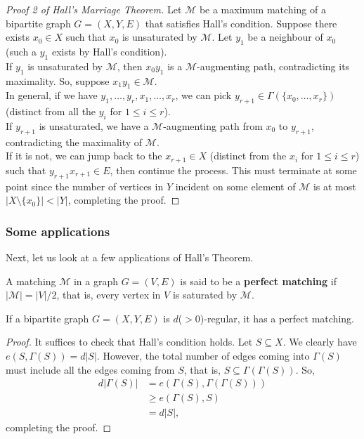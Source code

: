 			\begin{proof}[Proof 2 of Hall's Marriage Theorem]
				Let $\mathcal{M}$ be a maximum matching of a bipartite graph $G=(X,Y,E)$ that satisfies Hall's condition. Suppose there exists $x_0 \in X$ such that $x_0$ is unsaturated by $\mathcal{M}$. Let $y_1$ be a neighbour of $x_0$ (such a $y_1$ exists by Hall's condition).\\
				If $y_1$ is unsaturated by $\mathcal{M}$, then $x_0y_1$ is a $\mathcal{M}$-augmenting path, contradicting its maximality. So, suppose $x_1y_1 \in \mathcal{M}$.\\
				In general, if we have $y_1,\ldots,y_r,x_1,\ldots,x_r$, we can pick $y_{r+1}\in \Gamma(\{x_0,\ldots,x_r\})$ (distinct from all the $y_i$ for $1\le i\le r$).\\
				If $y_{r+1}$ is unsaturated, we have a $\mathcal{M}$-augmenting path from $x_0$ to $y_{r+1}$, contradicting the maximality of $\mathcal{M}$.\\
				If it is not, we can jump back to the $x_{r+1}\in X$ (distinct from the $x_i$ for $1\le i\le r$) such that $y_{r+1}x_{r+1} \in E$, then continue the process. This must terminate at some point since the number of vertices in $Y$ incident on some element of $\mathcal{M}$ is at most $|X\setminus\{x_0\}|< |Y|$, completing the proof.
			\end{proof}

		\subsubsection{Some applications}

			Next, let us look at a few applications of Hall's Theorem.

			\begin{fdef}
				A matching $\mathcal{M}$ in a graph $G=(V,E)$ is said to be a \textbf{perfect matching} if $|\mathcal{M}| = |V|/2$, that is, every vertex in $V$ is saturated by $\mathcal{M}$.
			\end{fdef}

			\begin{ftheo}
				If a bipartite graph $G=(X,Y,E)$ is $d$($>0$)-regular, it has a perfect matching.
			\end{ftheo}
			\begin{proof}
				It suffices to check that Hall's condition holds. Let $S\subseteq X$. We clearly have $e(S,\Gamma(S))=d|S|$. However, the total number of edges coming into $\Gamma(S)$ must include all the edges coming from $S$, that is, $S\subseteq\Gamma(\Gamma(S))$. So,
				\begin{align*}
					d|\Gamma(S)| &= e(\Gamma(S),\Gamma(\Gamma(S))) \\
						&\ge e(\Gamma(S),S) \\
						&= d|S|,
				\end{align*}
				completing the proof.
			\end{proof}

